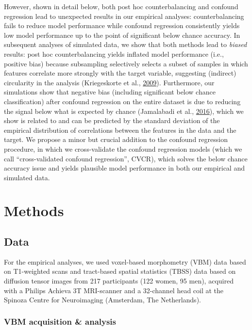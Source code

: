 \documentclass[11pt,american,a4paper,oneside,]{memoir} %
\begin{document}
However, shown in detail below, both post hoc counterbalancing and confound regression lead to unexpected results in our empirical analyses: counterbalancing fails to reduce model performance while confound regression consistently yields low model performance up to the point of significant below chance accuracy. In subsequent analyses of simulated data, we show that both methods lead to \emph{biased} results: post hoc counterbalancing yields inflated model performance (i.e., positive bias) because subsampling selectively selects a subset of samples in which features correlate more strongly with the target variable, suggesting (indirect) circularity in the analysis (Kriegeskorte et al., \protect\hyperlink{ref-kriegeskorte2009circular}{2009}). Furthermore, our simulations show that negative bias (including significant below chance classification) after confound regression on the entire dataset is due to reducing the signal below what is expected by chance (Jamalabadi et al., \protect\hyperlink{ref-Jamalabadi2016-gr}{2016}), which we show is related to and can be predicted by the standard deviation of the empirical distribution of correlations between the features in the data and the target. We propose a minor but crucial addition to the confound regression procedure, in which we cross-validate the confound regression models (which we call ``cross-validated confound regression'', CVCR), which solves the below chance accuracy issue and yields plausible model performance in both our empirical and simulated data.

\hypertarget{confounds-decoding-methods}{%
\section{Methods}\label{confounds-decoding-methods}}

\hypertarget{confounds-decoding-methods-data}{%
\subsection{Data}\label{confounds-decoding-methods-data}}

For the empirical analyses, we used voxel-based morphometry (VBM) data based on T1-weighted scans and tract-based spatial statistics (TBSS) data based on diffusion tensor images from 217 participants (122 women, 95 men), acquired with a Philips Achieva 3T MRI-scanner and a 32-channel head coil at the Spinoza Centre for Neuroimaging (Amsterdam, The Netherlands).

\hypertarget{confounds-decoding-methods-data-vbm}{%
\subsubsection{VBM acquisition \& analysis}\label{confounds-decoding-methods-data-vbm}}
\end{document}
